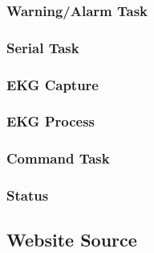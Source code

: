 \documentclass[12pt]{article} %
\begin{document}
    \subsubsection{Warning/Alarm Task}
    
    

    \subsubsection{Serial Task}
    
    

    \subsubsection{EKG Capture}
    
    

    \subsubsection{EKG Process}
    
    

    \subsubsection{Command Task}
    
    

    \subsubsection{Status}
    
    

    \subsection{Website Source}
    

    
\end{document}
